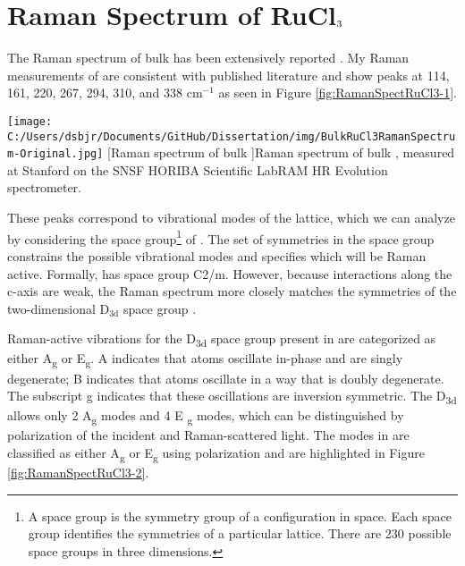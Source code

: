 \section{Raman Spectrum of \texorpdfstring{RuCl$\textsubscript{3}$}{RuCl3}}

The Raman spectrum of bulk \rucl has been extensively reported  \cite{Sandilands2015,Sandilands2016,Glamazda2017,Mashhadi2018,Zhou2018}. My Raman measurements of \rucl are consistent with published literature and show peaks at 114, 161, 220, 267, 294, 310, and 338 cm$^{-1}$ as seen in Figure \ref{fig:RamanSpectRuCl3-1}.

\begin{centering}
\texttt{[image: C:/Users/dsbjr/Documents/GitHub/Dissertation/img/BulkRuCl3RamanSpectrum-Original.jpg]}
  \captionsetup{width=0.75\textwidth}
  [Raman spectrum of bulk \ruclnospace]{Raman spectrum of bulk \ruclnospace, measured at Stanford on the SNSF HORIBA Scientific LabRAM HR Evolution spectrometer.}
  \label{fig:RamanSpectRuCl3-1}
\end{centering}

These peaks correspond to vibrational modes of the lattice, which we can analyze by considering the space group\footnote{A space group is the symmetry group of a configuration in space. Each space group identifies the symmetries of a particular lattice. There are 230 possible space groups in three dimensions.} of \ruclnospace. The set of symmetries in the space group constrains the possible vibrational modes and specifies which will be Raman active. Formally, \rucl has space group C2/m. However, because interactions along the c-axis are weak, the Raman spectrum more closely matches the symmetries of the two-dimensional D$_{\text{3d}}$ space group \cite{Sandilands2015}.

Raman-active vibrations for the D\textsubscript{3d} space group present in \rucl are categorized as either A\textsubscript{g} or E\textsubscript{g}. A indicates that atoms oscillate in-phase and are singly degenerate; B indicates that atoms oscillate in a way that is doubly degenerate. The subscript g indicates that these oscillations are inversion symmetric. The D\textsubscript{3d} allows only 2 A\textsubscript{g} modes and 4 E \textsubscript{g} modes, which can be distinguished by polarization of the incident and Raman-scattered light. The modes in \rucl are classified as either A\textsubscript{g} or E\textsubscript{g} using polarization and are  highlighted in Figure \ref{fig:RamanSpectRuCl3-2}.

